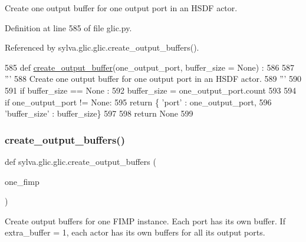 \begin{DoxyVerb}  Create one output buffer for one output port in an HSDF actor.
\end{DoxyVerb}
 

Definition at line 585 of file glic.\+py.



Referenced by sylva.\+glic.\+glic.\+create\+\_\+output\+\_\+buffers().


\begin{DoxyCode}
585   \textcolor{keyword}{def }\hyperlink{namespacesylva_1_1glic_1_1glic_a414741c04de0838d506dbeee050368a6}{create\_output\_buffer}(one\_output\_port, buffer\_size = None) :
586 
587     \textcolor{stringliteral}{'''}
588 \textcolor{stringliteral}{      Create one output buffer for one output port in an HSDF actor.}
589 \textcolor{stringliteral}{    '''}
590 
591     \textcolor{keywordflow}{if} buffer\_size == \textcolor{keywordtype}{None} :
592       buffer\_size = one\_output\_port.count
593 
594     \textcolor{keywordflow}{if} one\_output\_port != \textcolor{keywordtype}{None}:
595       \textcolor{keywordflow}{return} \{ \textcolor{stringliteral}{'port'} : one\_output\_port,
596                \textcolor{stringliteral}{'buffer\_size'} : buffer\_size\}
597 
598     \textcolor{keywordflow}{return} \textcolor{keywordtype}{None}
599 
\end{DoxyCode}
\mbox{\label{namespacesylva_1_1glic_1_1glic_a53c55762a3c7d476be7ee748baeccbeb}} 
\subsubsection{\texorpdfstring{create\+\_\+output\+\_\+buffers()}{create\_output\_buffers()}}
{\footnotesize\ttfamily def sylva.\+glic.\+glic.\+create\+\_\+output\+\_\+buffers (\begin{DoxyParamCaption}\item[{}]{one\+\_\+fimp }\end{DoxyParamCaption})}

\begin{DoxyVerb}  Create output buffers for one FIMP instance.
  Each port has its own buffer.
  If extra_buffer = 1,
    each actor has its own buffers for all its output ports.
\end{DoxyVerb}
 

